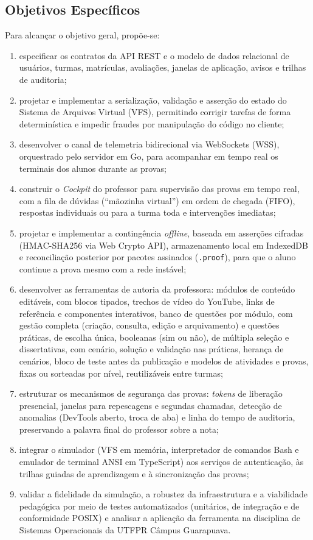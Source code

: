\subsection{Objetivos Específicos}
Para alcançar o objetivo geral, propõe-se:
\begin{enumerate}
    \item especificar os contratos da API REST e o modelo de dados relacional de usuários, turmas, matrículas, avaliações, janelas de aplicação, avisos e trilhas de auditoria;
    \item projetar e implementar a serialização, validação e asserção do estado do Sistema de Arquivos Virtual (VFS), permitindo corrigir tarefas de forma determinística e impedir fraudes por manipulação do código no cliente;
    \item desenvolver o canal de telemetria bidirecional via WebSockets (WSS), orquestrado pelo servidor em Go, para acompanhar em tempo real os terminais dos alunos durante as provas;
    \item construir o \textit{Cockpit} do professor para supervisão das provas em tempo real, com a fila de dúvidas (``mãozinha virtual'') em ordem de chegada (FIFO), respostas individuais ou para a turma toda e intervenções imediatas;
    \item projetar e implementar a contingência \textit{offline}, baseada em asserções cifradas (HMAC-SHA256 via Web Crypto API), armazenamento local em IndexedDB e reconciliação posterior por pacotes assinados (\texttt{.proof}), para que o aluno continue a prova mesmo com a rede instável;
    \item desenvolver as ferramentas de autoria da professora: módulos de conteúdo editáveis, com blocos tipados, trechos de vídeo do YouTube, links de referência e componentes interativos, banco de questões por módulo, com gestão completa (criação, consulta, edição e arquivamento) e questões práticas, de escolha única, booleanas (sim ou não), de múltipla seleção e dissertativas, com cenário, solução e validação nas práticas, herança de cenários, bloco de teste antes da publicação e modelos de atividades e provas, fixas ou sorteadas por nível, reutilizáveis entre turmas;
    \item estruturar os mecanismos de segurança das provas: \textit{tokens} de liberação presencial, janelas para repescagens e segundas chamadas, detecção de anomalias (DevTools aberto, troca de aba) e linha do tempo de auditoria, preservando a palavra final do professor sobre a nota;
    \item integrar o simulador (VFS em memória, interpretador de comandos Bash e emulador de terminal ANSI em TypeScript) aos serviços de autenticação, às trilhas guiadas de aprendizagem e à sincronização das provas;
    \item validar a fidelidade da simulação, a robustez da infraestrutura e a viabilidade pedagógica por meio de testes automatizados (unitários, de integração e de conformidade POSIX) e analisar a aplicação da ferramenta na disciplina de Sistemas Operacionais da UTFPR Câmpus Guarapuava.
\end{enumerate}

